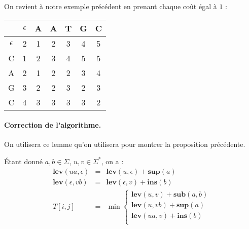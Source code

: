 \begin{example} On revient à notre exemple précédent en prenant chaque coût égal à $1$ :

\begin{center}
\begin{tabular}{|c|c|c|c|c|c|c|}
\hline
& $\epsilon$ & A & A & T & G & C \\ \hline
$\epsilon$ & {\color{red}2} & 1 & 2 & 3 & 4 & 5\\ \hline
C & 1 & {\color{red}2} & 3 & 4 & 5 & 5\\ \hline
A & 2 & 1 & {\color{red}2} & {\color{red}2} & 3 & 4\\ \hline
G & 3 & 2 & 2 & 3 & {\color{red}2} & 3 \\ \hline
C & 4 & 3 & 3 & 3 & 3 & {\color{red}2}\\ \hline
\end{tabular}
\end{center}
\end{example}

\paragraph{Correction de l'algorithme.}

On utilisera ce lemme qu'on utilisera pour montrer la proposition précédente.

\begin{lemma}
Étant donné $a,b\in \Sigma$, $u,v \in \Sigma^*$, on a :
$$
\begin{array}{lll}
\mathbf{lev}(ua,\epsilon) &= &\mathbf{lev}(u,\epsilon) + \mathbf{sup}(a) \\
\mathbf{lev}(\epsilon,vb) &= &\mathbf{lev}(\epsilon,v) + \mathbf{ins}(b) \\
T[i,j] &= &\min \left\lbrace 
\begin{array}{l}
\mathbf{lev}(u,v)+ \mathbf{sub}(a,b) \\
\mathbf{lev}(u,vb) + \mathbf{sup}(a) \\
\mathbf{lev}(ua,v) + \mathbf{ins}(b) \\
\end{array}
\right.
\end{array}
$$
\end{lemma}

